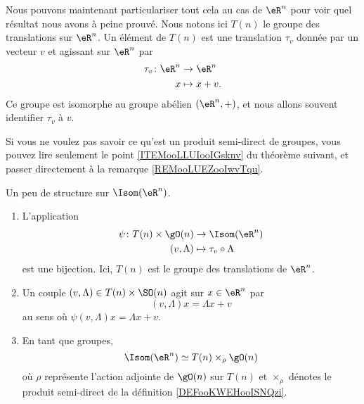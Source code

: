 Nous pouvons maintenant particulariser tout cela au cas de \( \eR^n\) pour voir quel résultat nous avons à peine prouvé. Nous notons ici \( T(n)\) le groupe des translations sur \( \eR^n\). Un élément de \( T(n)\) est une translation \( \tau_v\) donnée par un vecteur \( v\) et agissant sur \( \eR^n\) par
\begin{equation}
    \begin{aligned}
        \tau_v\colon \eR^n&\to \eR^{n} \\
        x&\mapsto x+v. 
    \end{aligned}
\end{equation}
Ce groupe est isomorphe au groupe abélien \( (\eR^n,+)\), et nous allons souvent identifier \( \tau_v\) à \( v\).

Si vous ne voulez pas savoir ce qu'est un produit semi-direct de groupes, vous pouvez lire seulement le point \ref{ITEMooLLUIooIGsknv} du théorème suivant, et passer directement à la remarque \ref{REMooLUEZooIwvTqu}.
\begin{theorem}     \label{THOooQJSRooMrqQct}
    Un peu de structure sur \( \Isom(\eR^n)\).
    \begin{enumerate}
        \item       \label{ITEMooLLUIooIGsknv}
            L'application
            \begin{equation}
                \begin{aligned}
                    \psi\colon T(n)\times \gO(n)&\to \Isom(\eR^n) \\
                    (v,\Lambda)&\mapsto \tau_v\circ\Lambda 
                \end{aligned}
            \end{equation}
            est une bijection. Ici,  \( T(n)\) est le groupe des translations de \( \eR^n\).
        \item
            Un couple \( (v,\Lambda)\in T(n)\times\SO(n)\) agit sur \( x\in \eR^n\) par
            \begin{equation}
                (v,\Lambda)x=\Lambda x+v
            \end{equation}
            au sens où \( \psi(v,\Lambda)x=\Lambda x+v\).
        \item       \label{ITEMooEWSIooNKzRxB}
            En tant que groupes,
            \begin{equation}
                \Isom(\eR^n)\simeq T(n)\times_{\rho}\gO(n)
            \end{equation}
            où \( \rho\) représente l'action adjointe de \( \gO(n)\) sur \( T(n)\) et \( \times_{\rho}\) dénotes le produit semi-direct de la définition \ref{DEFooKWEHooISNQzi}.
    \end{enumerate}
\end{theorem}

